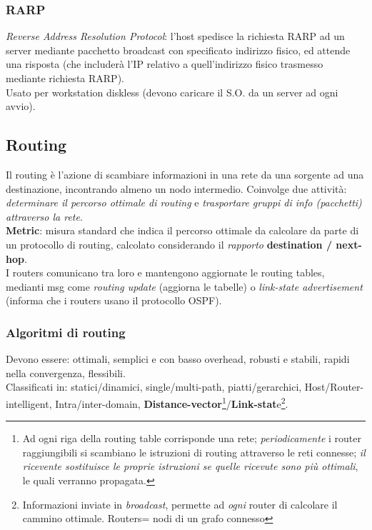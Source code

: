 \documentclass[a4paper,11pt]{article}
\begin{document}
 \subsubsection{RARP}
\textit{ Reverse Address Resolution Protocol}: l'host spedisce la richiesta RARP ad un server mediante pacchetto broadcast con specificato indirizzo fisico, ed attende una risposta (che includerà l'IP relativo a quell'indirizzo fisico trasmesso mediante richiesta RARP).\\
Usato per workstation diskless (devono caricare il S.O. da un server ad ogni avvio).
\newpage
\subsection{Routing}
Il routing è l'azione di scambiare informazioni in una rete da una sorgente ad una destinazione, incontrando almeno un nodo intermedio. Coinvolge due attività: \textit{determinare il percorso ottimale di routing} e \textit{trasportare gruppi di info (pacchetti) attraverso la rete}.\\
\textbf{Metric}: misura standard che indica il percorso ottimale da calcolare da parte di un protocollo di routing, calcolato considerando il \textit{rapporto} \textbf{destination / next-hop}.\\
I routers comunicano tra loro e mantengono aggiornate le routing tables, medianti msg come \textit{routing update} (aggiorna le tabelle) o \textit{link-state advertisement} (informa che i routers usano il protocollo OSPF).

\subsubsection{Algoritmi di routing}
Devono essere: ottimali, semplici e con basso overhead, robusti e stabili, rapidi nella convergenza, flessibili.\\
Classificati in: statici/dinamici, single/multi-path, piatti/gerarchici, Host/Router-intelligent, Intra/inter-domain, \textbf{Distance-vector}\footnote{Ad ogni riga della routing table corrisponde una rete; \textit{periodicamente} i router raggiungibili si scambiano le istruzioni di routing attraverso le reti connesse; \textit{il ricevente sostituisce le proprie istruzioni se quelle ricevute sono più ottimali}, le quali verranno propagata.}/\textbf{Link-stat}e\footnote{Informazioni inviate in \textit{broadcast}, permette ad \textit{ogni} router di calcolare il cammino ottimale. Routers= nodi di un grafo connesso}.
 
\end{document}
